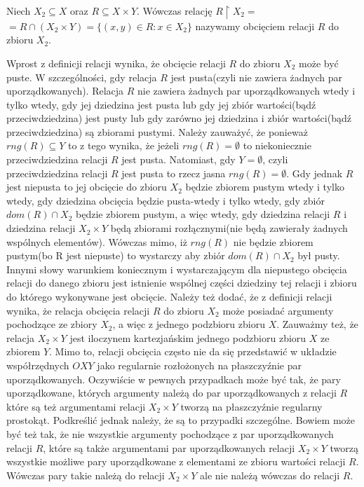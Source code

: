 \begin{definition}
Niech $X_{2}\subseteq X$ oraz $R\subseteq X\times Y$.
Wówczas relację $R\upharpoonright X_{2}=$ $=R\cap \left (X_{2}\times Y \right)=\{\left (x,y \right)\in R: x\in X_{2}\}$ nazywamy obcięciem relacji $R$ do zbioru $X_{2}$.
\end{definition}
\begin{remark}
Wprost z definicji relacji wynika, że obcięcie relacji $R$ do zbioru $X_{2}$ może być puste. W szczególności, gdy relacja $R$ jest pusta(czyli nie zawiera żadnych par uporządkowanych). Relacja $R$ nie zawiera żadnych par uporządkowanych wtedy i tylko wtedy, gdy jej dziedzina jest pusta lub gdy jej zbiór wartości(bądź przeciwdziedzina) jest pusty lub gdy zarówno jej dziedzina i zbiór wartości(bądź przeciwdziedzina) są zbiorami pustymi. Należy zauważyć, że ponieważ $rng(R)\subseteq Y$ to z tego wynika, że jeżeli $rng(R)=\emptyset$ to niekoniecznie przeciwdziedzina relacji $R$ jest pusta. Natomiast, gdy $Y=\emptyset$, czyli przeciwdziedzina relacji $R$ jest pusta to rzecz jasna $rng(R)=\emptyset$. Gdy jednak $R$ jest niepusta to jej obcięcie do zbioru $X_{2}$ będzie zbiorem pustym wtedy i tylko wtedy, gdy dziedzina obcięcia będzie pusta-wtedy i tylko wtedy, gdy zbiór $dom(R)\cap X_{2}$ będzie zbiorem pustym, a więc wtedy, gdy dziedzina relacji $R$ i dziedzina relacji $X_{2}\times Y$ będą zbiorami rozłącznymi(nie będą zawierały żadnych wspólnych elementów). Wówczas mimo, iż $rng(R)$ nie będzie zbiorem pustym(bo R jest niepuste) to wystarczy aby zbiór $dom(R)\cap X_{2}$ był pusty. Innymi słowy warunkiem koniecznym i wystarczającym dla niepustego obcięcia relacji do danego zbioru jest istnienie wspólnej części dziedziny tej relacji i zbioru do którego wykonywane jest obcięcie.
Należy też dodać, że z definicji relacji wynika, że relacja obcięcia relacji $R$ do zbioru $X_{2}$ może posiadać argumenty pochodzące ze zbiory $X_{2}$, a więc z jednego podzbioru zbioru $X$. Zauważmy też, że relacja $X_{2}\times Y$ jest
iloczynem kartezjańskim jednego podzbioru zbioru $X$ ze zbiorem $Y$. Mimo to, relacji obcięcia często nie da się przedstawić w układzie współrzędnych $OXY$
jako regularnie rozłożonych na płaszczyźnie par uporządkowanych. Oczywiście w pewnych przypadkach może być tak, że pary uporządkowane, których argumenty należą do par uporządkowanych z relacji $R$
które są też argumentami relacji $X_{2}\times Y$ tworzą na płaszczyźnie regularny prostokąt. Podkreślić jednak należy, że są to przypadki szczególne. Bowiem może być też
tak, że nie wszystkie argumenty pochodzące z par uporządkowanych relacji $R$, które są także argumentami par uporządkowanych relacji $X_{2}\times Y$
tworzą wszystkie możliwe pary uporządkowane z elementami ze zbioru wartości relacji $R$. Wówczas pary takie należą do relacji $X_{2}\times Y$ ale nie należą
wówczas do relacji $R$.
\end{remark}
